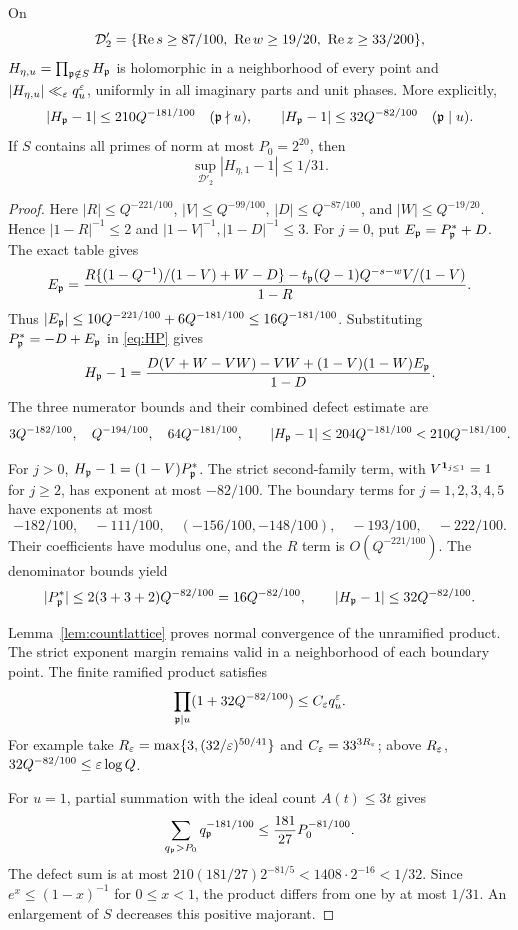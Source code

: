\begin{lemma}\label{lem:euler}
On
\begin{equation}\label{eq:D2}
 \mathcal D'_2=\{\operatorname{Re} s\ge87/100,\ \operatorname{Re} w\ge19/20,\ \operatorname{Re} z\ge33/200\},
\end{equation}
$H_{\eta,u}=\prod_{\mathfrak p\notin S}H_\mathfrak p$ is holomorphic in a neighborhood of every point and $|H_{\eta,u}|\ll_\varepsilon q_u^\varepsilon$, uniformly in all imaginary parts and unit phases. More explicitly,
\[
 |H_\mathfrak p-1|\le210Q^{-181/100}\quad(\mathfrak p\nmid u),\qquad
 |H_\mathfrak p-1|\le32Q^{-82/100}\quad(\mathfrak p\mid u).
\]
If $S$ contains all primes of norm at most $P_0=2^{20}$, then
\begin{equation}\label{eq:contraction}
 \sup_{\mathcal D'_2}|H_{\eta,1}-1|\le1/31.
\end{equation}
\end{lemma}
\begin{proof}
Here $|R|\le Q^{-221/100}$, $|V|\le Q^{-99/100}$, $|D|\le Q^{-87/100}$, and $|W|\le Q^{-19/20}$. Hence $|1-R|^{-1}\le2$ and $|1-V|^{-1},|1-D|^{-1}\le3$. For $j=0$, put $E_\mathfrak p=P_\mathfrak p^*+D$. The exact table gives
\begin{equation}\label{eq:Eprime}
 E_\mathfrak p=\frac{R\{(1-Q^{-1})/(1-V)+W-D\}
       -t_\mathfrak p(Q-1)Q^{-s-w}V/(1-V)}{1-R}.
\end{equation}
Thus $|E_\mathfrak p|\le10Q^{-221/100}+6Q^{-181/100}\le16Q^{-181/100}$. Substituting $P_\mathfrak p^*=-D+E_\mathfrak p$ in \eqref{eq:HP} gives
\[
 H_\mathfrak p-1=\frac{D(V+W-VW)-VW+(1-V)(1-W)E_\mathfrak p}{1-D}.
\]
The three numerator bounds and their combined defect estimate are
\[
 3Q^{-182/100},\quad Q^{-194/100},\quad64Q^{-181/100},
 \qquad |H_\mathfrak p-1|\le204Q^{-181/100}<210Q^{-181/100}.
\]

For $j>0$, $H_\mathfrak p-1=(1-V)P_\mathfrak p^*$. The strict second-family term, with $V^{\mathbf 1_{j\le1}}=1$ for $j\ge2$, has exponent at most $-82/100$. The boundary terms for $j=1,2,3,4,5$ have exponents at most
\[
 -182/100,\quad-111/100,\quad(-156/100,-148/100),\quad-193/100,\quad-222/100.
\]
Their coefficients have modulus one, and the $R$ term is $O(Q^{-221/100})$. The denominator bounds yield
\[
 |P_\mathfrak p^*|\le2(3+3+2)Q^{-82/100}=16Q^{-82/100},\qquad
 |H_\mathfrak p-1|\le32Q^{-82/100}.
\]

Lemma~\ref{lem:countlattice} proves normal convergence of the unramified product. The strict exponent margin remains valid in a neighborhood of each boundary point. The finite ramified product satisfies
\[
 \prod_{\mathfrak p\mid u}(1+32Q^{-82/100})\le C_\varepsilon q_u^\varepsilon.
\]
For example take $R_\varepsilon=\max\{3,(32/\varepsilon)^{50/41}\}$ and $C_\varepsilon=33^{3R_\varepsilon}$; above $R_\varepsilon$, $32Q^{-82/100}\le\varepsilon\log Q$.

For $u=1$, partial summation with the ideal count $A(t)\le3t$ gives
\[
 \sum_{q_\mathfrak p>P_0}q_\mathfrak p^{-181/100}\le\frac{181}{27}P_0^{-81/100}.
\]
The defect sum is at most $210(181/27)2^{-81/5}<1408\cdot2^{-16}<1/32$. Since $e^x\le(1-x)^{-1}$ for $0\le x<1$, the product differs from one by at most $1/31$. An enlargement of $S$ decreases this positive majorant.
\end{proof}

